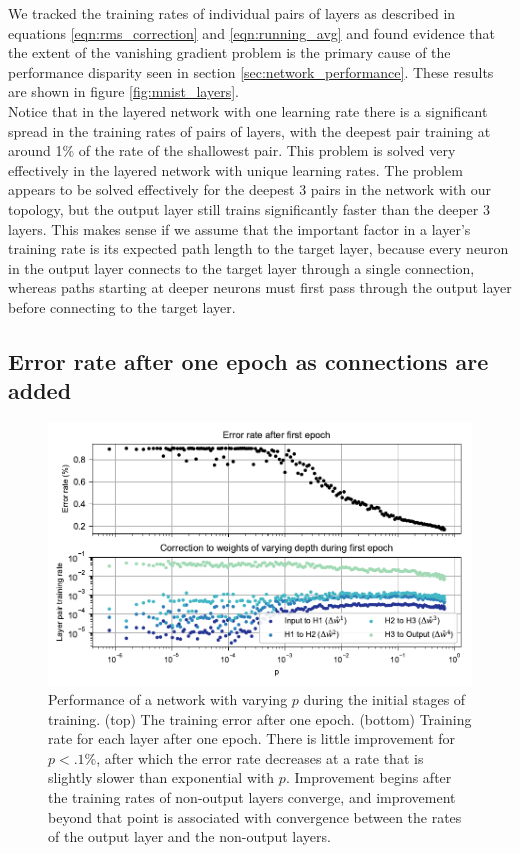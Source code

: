 \documentclass[format=sigconf]{acmart}
\newcommand{\npar}{\\\indent}
\begin{document}
We tracked the training rates of individual pairs of layers as described in equations \ref{eqn:rms_correction} and \ref{eqn:running_avg} and found evidence that the extent of the vanishing gradient problem is the primary cause of the performance disparity seen in section \ref{sec:network_performance}. These results are shown in figure \ref{fig:mnist_layers}.
\npar
Notice that in the layered network with one learning rate there is a significant spread in the training rates of pairs of layers, with the deepest pair training at around 1\% of the rate of the shallowest pair. This problem is solved very effectively in the layered network with unique learning rates. The problem appears to be solved effectively for the deepest 3 pairs in the network with our topology, but the output layer still trains significantly faster than the deeper 3 layers. This makes sense if we assume that the important factor in a layer's training rate is its expected path length to the target layer, because every neuron in the output layer connects to the target layer through a single connection, whereas paths starting at deeper neurons must first pass through the output layer before connecting to the target layer.

\subsection{Error rate after one epoch as connections are added}
\label{sec:mnist_1epoch}

\begin{figure}
  \centering
  \includegraphics[width=\columnwidth]{figures/MNIST_one_epoch_performance.pdf}
  \caption{Performance of a network with  varying $p$ during the initial stages of training. (top) The training error after one epoch. (bottom) Training rate for each layer after one epoch. There is little improvement for $p<.1\%$, after which the error rate decreases at a rate that is slightly slower than exponential with $p$. Improvement begins after the training rates of non-output layers converge, and improvement beyond that point is associated with convergence between the rates of the output layer and the non-output layers.}
  \label{fig:mnist_1epoch}
\end{figure}
\end{document}
